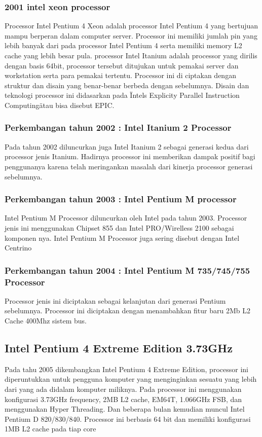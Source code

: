 			\subsubsection{2001 intel xeon processor}
 	Processor Intel Pentium 4 Xeon adalah processor Intel Pentium 4 yang bertujuan mampu berperan dalam computer server. Processor ini memiliki jumlah pin yang lebih banyak dari pada processor Intel Pentium 4 serta memiliki memory L2 cache yang lebih besar pula.
 	processor Intel Itanium adalah processor yang dirilis dengan basis 64bit, processor tersebut ditujukan untuk pemakai server dan workstation serta para pemakai tertentu. Processor ini di ciptakan dengan struktur dan disain yang benar-benar berbeda dengan sebelumnya. Disain dan teknologi processor ini didasarkan pada \"Intels Explicity Parallel Instruction Computing\" atau bisa disebut EPIC.


 			\subsubsection{Perkembangan tahun 2002 : Intel Itanium 2 Processor }
 	Pada tahun 2002 diluncurkan juga Intel Itanium 2 sebagai generasi kedua dari processor jenis Itanium. Hadirnya processor ini memberikan dampak positif bagi penggunanya karena telah meringankan masalah dari kinerja processor generasi sebelumnya.
 			\subsubsection{Perkembangan tahun 2003 : Intel Pentium M processor}
 	Intel Pentium M Processor diluncurkan oleh Intel pada tahun 2003. Processor jenis ini menggunakan Chipset 855 dan Intel PRO/Wirelless 2100 sebagai komponen nya. Intel Pentium M Processor juga sering disebut dengan Intel Centrino
 			\subsubsection{Perkembangan tahun 2004 : Intel Pentium M 735/745/755 Processor}
 	Processor jenis ini diciptakan sebagai kelanjutan dari generasi Pentium sebelumnya. Processor ini diciptakan dengan menambahkan fitur baru 2Mb L2 Cache 400Mhz sistem bus.


 			\subsection{Intel Pentium 4 Extreme Edition 3.73GHz}
 	Pada tahu 2005 dikembangkan Intel Pentium 4 Extreme Edition, processor ini diperuntukkan untuk pengguna komputer yang menginginkan sesuatu yang lebih dari yang ada didalam komputer miliknya. Pada processor ini menggunakan konfigurasi  3.73GHz frequency, 2MB L2 cache, EM64T, 1.066GHz FSB, dan menggunakan Hyper Threading. Dan beberapa bulan kemudian muncul Intel Pentium D 820/830/840. Processor ini berbasis 64 bit dan memiliki konfigurasi 1MB L2 cache pada tiap core

